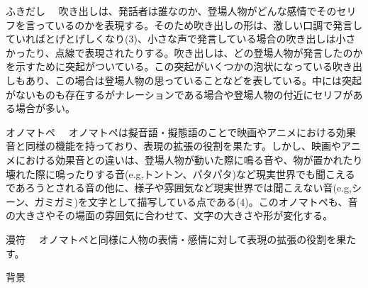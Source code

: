 \documentclass[a4j]{matsushita-zemi}
\begin{document}
ふきだし
　吹き出しは、発話者は誰なのか、登場人物がどんな感情でそのセリフを言っているのかを表現する。そのため吹き出しの形は、激しい口調で発言していればとげとげしくなり(3)、小さな声で発言している場合の吹き出しは小さかったり、点線で表現されたりする。吹き出しは、どの登場人物が発言したのかを示すために突起がついている。この突起がいくつかの泡状になっている吹き出しもあり、この場合は登場人物の思っていることなどを表している。中には突起がないものも存在するがナレーションである場合や登場人物の付近にセリフがある場合が多い。

オノマトペ
　オノマトペは擬音語・擬態語のことで映画やアニメにおける効果音と同様の機能を持っており、表現の拡張の役割を果たす。しかし、映画やアニメにおける効果音との違いは、登場人物が動いた際に鳴る音や、物が置かれたり壊れた際に鳴ったりする音(e.g,トントン、パタパタ)など現実世界でも聞こえるであろうとされる音の他に、様子や雰囲気など現実世界では聞こえない音(e.g,シーン、ガミガミ)を文字として描写している点である(4)。このオノマトペも、音の大きさやその場面の雰囲気に合わせて、文字の大きさや形が変化する。

漫符
　オノマトペと同様に人物の表情・感情に対して表現の拡張の役割を果たす。

背景
\end{document}

